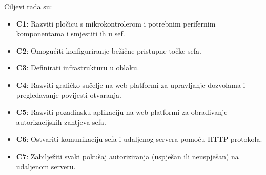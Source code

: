 Ciljevi rada su:

\begin{itemize}
    \item \textbf{C1}: Razviti pločicu s mikrokontrolerom i potrebnim perifernim komponentama i smjestiti ih u sef.
    \item \textbf{C2}: Omogućiti konfiguriranje bežične pristupne točke sefa.
    \item \textbf{C3}: Definirati infrastrukturu u oblaku.
    \item \textbf{C4}: Razviti grafičko sučelje na web platformi za upravljanje dozvolama i pregledavanje povijesti otvaranja.
    \item \textbf{C5}: Razviti pozadinsku aplikaciju na web platformi za obrađivanje autorizacijskih zahtjeva sefa.
    \item \textbf{C6}: Ostvariti komunikaciju sefa i udaljenog servera pomoću HTTP protokola.
    \item \textbf{C7}: Zabilježiti svaki pokušaj autoriziranja (uspješan ili neuspješan) na udaljenom serveru.
\end{itemize}
